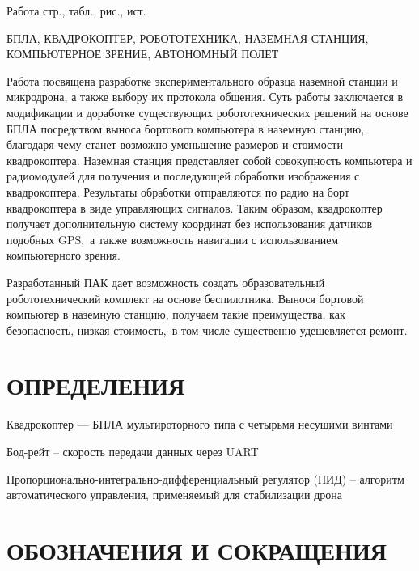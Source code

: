 \documentclass[a4paper,12pt]{article}
\newcounter{mycitecount}                                %
\begin{document}
\thispagestyle{empty} %

Работа  стр.,  табл.,  рис., \totalmycitecounts ист. 

БПЛА, КВАДРОКОПТЕР, РОБОТОТЕХНИКА, НАЗЕМНАЯ СТАНЦИЯ, КОМПЬЮТЕРНОЕ ЗРЕНИЕ, АВТОНОМНЫЙ ПОЛЕТ

Работа посвящена разработке экспериментального образца наземной станции и микродрона, а также выбору их протокола общения.
Суть работы заключается в модификации и доработке существующих робототехнических решений на основе БПЛА посредством выноса бортового компьютера в наземную станцию, благодаря чему станет возможно уменьшение размеров и стоимости квадрокоптера.
Наземная станция представляет собой совокупность компьютера и радиомодулей для получения и последующей обработки изображения с квадрокоптера. Результаты обработки отправляются по радио на борт квадрокоптера в виде управляющих сигналов.
Таким образом, квадрокоптер получает дополнительную систему координат без использования датчиков подобных GPS, а также возможность навигации с использованием компьютерного зрения.

Разработанный ПАК дает возможность создать образовательный робототехнический комплект на основе беспилотника. Вынося бортовой компьютер в наземную станцию, получаем такие преимущества, как безопасность, низкая стоимость, в том числе существенно удешевляется ремонт.

\pagebreak
\thispagestyle{empty}

\section*{\centering ОПРЕДЕЛЕНИЯ}

\thispagestyle{empty} %

Квадрокоптер --- БПЛА мультироторного типа с четырьмя несущими винтами

Бод-рейт -- скорость передачи данных через UART

Пропорционально-интегрально-дифференциальный регулятор (ПИД) – алгоритм автоматического управления, применяемый для стабилизации дрона

\pagebreak
\thispagestyle{empty}

\section*{\centering ОБОЗНАЧЕНИЯ И СОКРАЩЕНИЯ}
\end{document}
